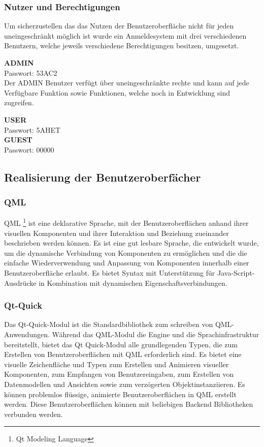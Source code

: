 \subsubsection{Nutzer und Berechtigungen}

Um sicherzustellen das das Nutzen der Benutzeroberfläche nicht für jeden uneingeschränkt möglich ist wurde ein Anmeldesystem mit drei verschiedenen Benutzern, welche jeweils verschiedene Berechtigungen besitzen, umgesetzt.

{\small \textbf{ADMIN}}\\
Passwort: 53AC2\\

Der ADMIN Benutzer verfügt über uneingeschränkte rechte und kann auf jede Verfügbare Funktion sowie Funktionen, welche noch in Entwicklung sind zugreifen.

\textbf{USER}\\
Passwort: 5AHET\\

\textbf{GUEST}\\
Passwort: 00000\\


\newpage

\subsection{Realisierung der Benutzeroberfächer}

\subsubsection{QML} \label{sec:qml}
QML \footnote{Qt Modeling Language} ist eine deklarative Sprache, mit der Benutzeroberflächen anhand ihrer visuellen Komponenten und ihrer Interaktion und Beziehung zueinander beschrieben werden können. Es ist eine gut lesbare Sprache, die entwickelt wurde, um die dynamische Verbindung von Komponenten zu ermöglichen und die die einfache Wiederverwendung und Anpassung von Komponenten innerhalb einer Benutzeroberfläche erlaubt. Es bietet  Syntax mit Unterstützung für Java-Script-Ausdrücke in Kombination mit dynamischen Eigenschaftsverbindungen.

\subsubsection{Qt-Quick}
Das Qt-Quick-Modul ist die Standardbibliothek zum schreiben von QML-Anwendungen. Während das QML-Modul die Engine und die Sprachinfrastruktur bereitstellt, bietet das Qt Quick-Modul alle grundlegenden Typen, die zum Erstellen von Benutzeroberflächen mit QML erforderlich sind. Es bietet eine visuelle Zeichenfläche und Typen zum Erstellen und Animieren visueller Komponenten, zum Empfangen von Benutzereingaben, zum Erstellen von Datenmodellen und Ansichten sowie zum verzögerten Objektinstanziieren. Es können problemlos flüssige, animierte Benutzeroberflächen in QML erstellt werden. Diese Benutzeroberflächen können mit beliebigen Backend Bibliotheken verbunden werden.

